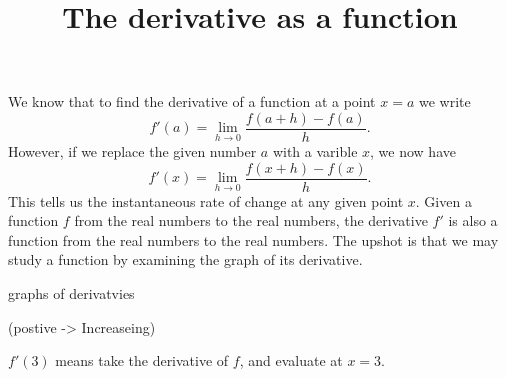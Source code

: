 \documentclass{ximera}
\title[Dig-in:]{The derivative as a function}
\begin{document}
\begin{abstract}
\end{abstract}
\maketitle

We know that to find the derivative of a function at a point $x=a$ we write
\[
f'(a) = \lim_{h\to 0}\frac{f(a+h)-f(a)}{h}.
\]
However, if we replace the given number $a$ with a varible $x$, we now
have
\[
f'(x) = \lim_{h\to 0}\frac{f(x+h)-f(x)}{h}.
\]
This tells us the instantaneous rate of change at any given point
$x$. Given a function $f$ from the real numbers to the real numbers,
the derivative $f'$ is also a function from the real numbers to the
real numbers. The upshot is that we may study a function by examining
the graph of its derivative.

graphs of derivatvies

(postive -> Increaseing)



\begin{defintion}
  $f'(3)$ means take the derivative of $f$, and evaluate at $x=3$.
\end{defintion}
\end{document}
